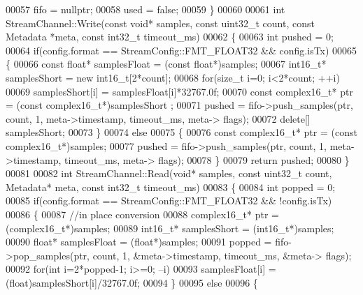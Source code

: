 \begin{DoxyCode}
00057     fifo = \textcolor{keyword}{nullptr};
00058     used = \textcolor{keyword}{false};
00059 \}
00060 
00061 \textcolor{keywordtype}{int} StreamChannel::Write(\textcolor{keyword}{const} \textcolor{keywordtype}{void}* samples, \textcolor{keyword}{const} uint32\_t count, \textcolor{keyword}{const} 
      Metadata *meta, \textcolor{keyword}{const} int32\_t timeout_ms)
00062 \{
00063     \textcolor{keywordtype}{int} pushed = 0;
00064     \textcolor{keywordflow}{if}(config.format == StreamConfig::FMT_FLOAT32 && config.isTx)
00065     \{
00066         \textcolor{keyword}{const} \textcolor{keywordtype}{float}* samplesFloat = (\textcolor{keyword}{const} \textcolor{keywordtype}{float}*)samples;
00067         int16\_t* samplesShort = \textcolor{keyword}{new} int16\_t[2*count];
00068         \textcolor{keywordflow}{for}(\textcolor{keywordtype}{size\_t} i=0; i<2*count; ++i)
00069             samplesShort[i] = samplesFloat[i]*32767.0f;
00070         \textcolor{keyword}{const} complex16_t* ptr = (\textcolor{keyword}{const} complex16_t*)samplesShort ;
00071         pushed = fifo->push_samples(ptr, count, 1, meta->timestamp, timeout\_ms, meta->
      flags);
00072         \textcolor{keyword}{delete}[] samplesShort;
00073     \}
00074     \textcolor{keywordflow}{else}
00075     \{
00076         \textcolor{keyword}{const} complex16_t* ptr = (\textcolor{keyword}{const} complex16_t*)samples;
00077         pushed = fifo->push_samples(ptr, count, 1, meta->timestamp, timeout\_ms, meta->
      flags);
00078     \}
00079     \textcolor{keywordflow}{return} pushed;
00080 \}
00081 
00082 \textcolor{keywordtype}{int} StreamChannel::Read(\textcolor{keywordtype}{void}* samples, \textcolor{keyword}{const} uint32\_t count, Metadata* meta, \textcolor{keyword}{const} int32\_t 
      timeout_ms)
00083 \{
00084     \textcolor{keywordtype}{int} popped = 0;
00085     \textcolor{keywordflow}{if}(config.format == StreamConfig::FMT_FLOAT32 && !config.isTx)
00086     \{
00087         \textcolor{comment}{//in place conversion}
00088         complex16_t* ptr = (complex16_t*)samples;
00089         int16\_t* samplesShort = (int16\_t*)samples;
00090         \textcolor{keywordtype}{float}* samplesFloat = (\textcolor{keywordtype}{float}*)samples;
00091         popped = fifo->pop_samples(ptr, count, 1, &meta->timestamp, timeout\_ms, &meta->
      flags);
00092         \textcolor{keywordflow}{for}(\textcolor{keywordtype}{int} i=2*popped-1; i>=0; --i)
00093             samplesFloat[i] = (\textcolor{keywordtype}{float})samplesShort[i]/32767.0f;
00094     \}
00095     \textcolor{keywordflow}{else}
00096     \{

\end{DoxyCode}
